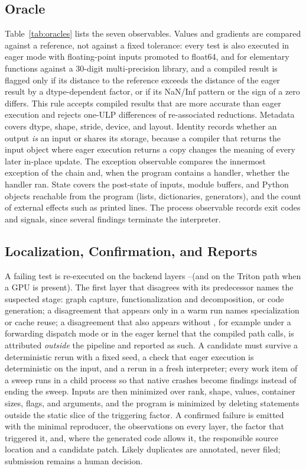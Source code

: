 \subsection{Oracle}
\label{sec:oracle}



Table~\ref{tab:oracles} lists the seven observables. Values and gradients are compared against a reference,
not against a fixed tolerance: every test is also executed in eager mode with floating-point inputs promoted to
float64, and for elementary functions against a 30-digit multi-precision library, and a compiled result is
flagged only if its distance to the reference exceeds the distance of the eager result by a dtype-dependent
factor, or if its NaN/Inf pattern or the sign of a zero differs. This rule accepts compiled results that are
more accurate than eager execution and rejects one-ULP differences of re-associated reductions. Metadata covers
dtype, shape, stride, device, and layout. Identity records whether an output \emph{is} an input or shares its
storage, because a compiler that returns the input object where eager execution returns a copy changes the
meaning of every later in-place update. The exception observable compares the innermost exception of the
 chain and, when the program contains a handler, whether the handler ran. State covers the
post-state of inputs, module buffers, and Python objects reachable from the program (lists, dictionaries,
generators), and the count of external effects such as printed lines. The process observable records exit codes
and signals, since several findings terminate the interpreter.

\subsection{Localization, Confirmation, and Reports}
\label{sec:phase3}

A failing test is re-executed on the backend layers \EO--\ER (and on the Triton path when a GPU is present).
The first layer that disagrees with its predecessor names the suspected stage: graph capture, functionalization
and decomposition, or code generation; a disagreement that appears only in a warm run names specialization or
cache reuse; a disagreement that also appears without \tcompile, for example under a forwarding dispatch mode
or in the eager kernel that the compiled path calls, is attributed \emph{outside} the pipeline and reported as
such. A candidate must survive a deterministic rerun with a fixed seed, a check that eager execution is
deterministic on the input, and a rerun in a fresh interpreter; every work item of a sweep runs in a child
process so that native crashes become findings instead of ending the sweep. Inputs are then minimized over
rank, shape, values, container sizes, flags, and arguments, and the program is minimized by deleting statements
outside the static slice of the triggering factor. A confirmed failure is emitted with the minimal reproducer, the observations on every layer, the factor that
triggered it, and, where the generated code allows it, the responsible source location and a candidate patch.
Likely duplicates are annotated, never filed; submission remains a human decision.
